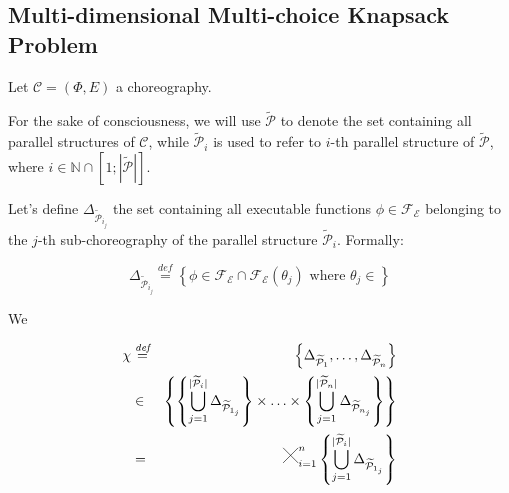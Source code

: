 \documentclass[12pt,a4paper]{report}
\newcommand{\Cross}{\mathbin{\tikz [x=2.5ex,y=2.5ex,line width=.10ex] \draw (0,0) -- (1,1) (0,1) -- (1,0);}}
\newcommand*{\N}{\mathbb{N}}
\newcommand{\mathDef}{\overset{\textit{def}}{=}}
\theoremstyle{definition}
\begin{document}
\newpage
\subsection{Multi-dimensional Multi-choice Knapsack Problem}

Let $\mathcal{C} = (\Phi,E)$ a choreography. 

For the sake of consciousness, we will use $\mathcal{\widetilde{P}}$ to denote the set containing all parallel structures of $\mathcal{C}$, while $\mathcal{\widetilde{P}}_i$ is used to refer to $i$-th parallel structure of $\mathcal{\widetilde{P}}$, where $i \in \N \cap \left[1;|\mathcal{\widetilde{P}}| \right]$.

Let's define $\Delta_{\mathcal{\widetilde{P}}_{i_j}}$ the set containing all executable functions $\phi \in \mathscr{F_E}$ belonging to the $j$-th sub-choreography of the parallel structure $\mathcal{\widetilde{P}}_i$. Formally:

\begin{equation}
	\Delta_{\mathcal{\widetilde{P}}_{i_j}} \mathDef \left\{ \phi \in \mathscr{F_E} \cap \mathscr{F_E}(\theta_j) \text{ where } \theta_j \in  \right\} 
\end{equation}

We 

\begin{eqnarray}
	\chi & \mathDef & \left\lbrace \Delta_{\mathcal{\widetilde{P}}_{1}}, \ldots, \Delta_{\mathcal{\widetilde{P}}_{n}} \right\rbrace \nonumber \\ 
	& \in & \left\{  \left\{ \bigcup_{j=1}^{|\mathcal{\widetilde{P}}_i|} \Delta_{\mathcal{\widetilde{P}}_{1_j}} \right\} \times \ldots \times \left\{ \bigcup_{j=1}^{|\mathcal{\widetilde{P}}_n|} \Delta_{\mathcal{\widetilde{P}}_{n_j}} \right\} \right\}  \nonumber \\
	& = & \Cross_{i = 1}^n  \left\{ \bigcup_{j=1}^{|\mathcal{\widetilde{P}}_i|} \Delta_{\mathcal{\widetilde{P}}_{1_j}} \right\}  \nonumber \\
\end{eqnarray}
\end{document}
